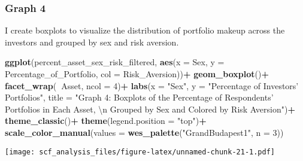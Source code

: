 \documentclass[
]{article}
\newenvironment{Shaded}{\begin{snugshade}}{\end{snugshade}}
\newcommand{\CharTok}[1]{\textcolor[rgb]{0.31,0.60,0.02}{#1}}
\newcommand{\DataTypeTok}[1]{\textcolor[rgb]{0.13,0.29,0.53}{#1}}
\newcommand{\DecValTok}[1]{\textcolor[rgb]{0.00,0.00,0.81}{#1}}
\newcommand{\KeywordTok}[1]{\textcolor[rgb]{0.13,0.29,0.53}{\textbf{#1}}}
\newcommand{\NormalTok}[1]{#1}
\newcommand{\OperatorTok}[1]{\textcolor[rgb]{0.81,0.36,0.00}{\textbf{#1}}}
\newcommand{\StringTok}[1]{\textcolor[rgb]{0.31,0.60,0.02}{#1}}
\begin{document}
\begin{Shaded}
\end{Shaded}

\hypertarget{graph-4}{%
\subsubsection{Graph 4}\label{graph-4}}

I create boxplots to visualize the distribution of portfolio makeup
across the investors and grouped by sex and risk aversion.

\begin{Shaded}
\begin{Highlighting}[]
\KeywordTok{ggplot}\NormalTok{(percent_asset_sex_risk_filtered, }\KeywordTok{aes}\NormalTok{(}\DataTypeTok{x =}\NormalTok{ Sex, }\DataTypeTok{y =}\NormalTok{ Percentage_of_Portfolio, }\DataTypeTok{col =}\NormalTok{ Risk_Aversion))}\OperatorTok{+}
\StringTok{  }\KeywordTok{geom_boxplot}\NormalTok{()}\OperatorTok{+}\StringTok{ }
\StringTok{  }\KeywordTok{facet_wrap}\NormalTok{(}\OperatorTok{~}\NormalTok{Asset, }\DataTypeTok{ncol =} \DecValTok{4}\NormalTok{)}\OperatorTok{+}\StringTok{ }
\StringTok{  }\KeywordTok{labs}\NormalTok{(}\DataTypeTok{x =} \StringTok{"Sex"}\NormalTok{, }\DataTypeTok{y =} \StringTok{"Percentage of Investors' Portfolios"}\NormalTok{, }\DataTypeTok{title =} \StringTok{"Graph 4: Boxplots of the Percentage of Respondents' Portfolios in Each Asset, }\CharTok{\textbackslash{}n}\StringTok{ Grouped by Sex and Colored by Risk Aversion"}\NormalTok{)}\OperatorTok{+}
\StringTok{  }\KeywordTok{theme_classic}\NormalTok{()}\OperatorTok{+}
\StringTok{  }\KeywordTok{theme}\NormalTok{(}\DataTypeTok{legend.position =} \StringTok{"top"}\NormalTok{)}\OperatorTok{+}
\StringTok{  }\KeywordTok{scale_color_manual}\NormalTok{(}\DataTypeTok{values =} \KeywordTok{wes_palette}\NormalTok{(}\StringTok{"GrandBudapest1"}\NormalTok{, }\DataTypeTok{n =} \DecValTok{3}\NormalTok{))}
\end{Highlighting}
\end{Shaded}

\texttt{[image: scf\_analysis\_files/figure-latex/unnamed-chunk-21-1.pdf]}
\end{document}
